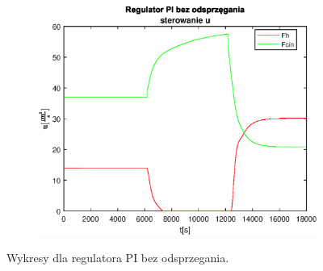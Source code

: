 \begin{figure}[h!]
   \begin{subfigure}[b]{0.4\textwidth}
      \includegraphics[width=1\linewidth]{img/PI/noDecoupler/noDisturbance/PINoDecouplerControl3Lintrue.eps}
      \caption{}
      \label{fig:fig:PINodDecoupler3Lintrue3}
   \end{subfigure}
       
   \caption{Wykresy dla regulatora PI bez odsprzegania.}
   \label{fig:PINodDecoupler3Lintrue}
\end{figure}
           
